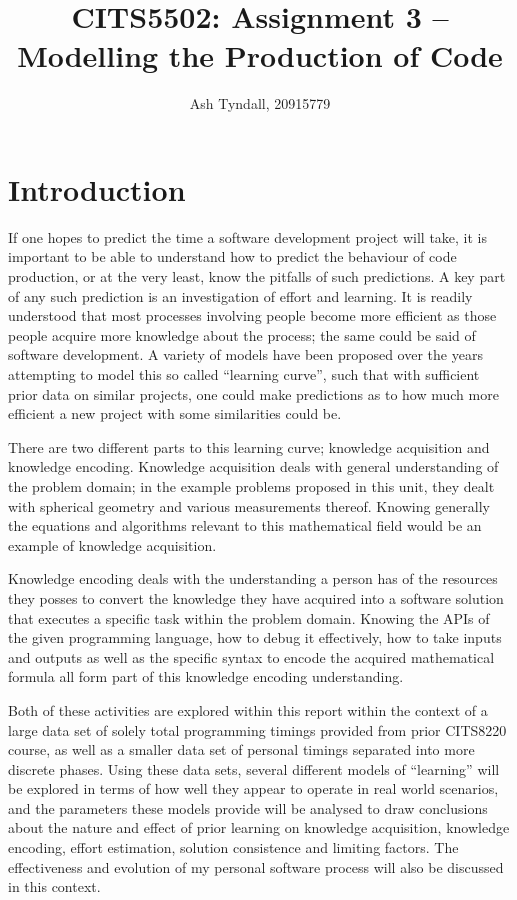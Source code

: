 \documentclass[a4paper,10pt]{article}
\title{CITS5502: Assignment 3 -- Modelling the Production of Code}
\author{Ash Tyndall, 20915779}
\begin{document}
\pagestyle{fancy}
\maketitle
\fontsize{10pt}{11pt}\selectfont
\tableofcontents

\clearpage
\fontsize{11pt}{13pt}\selectfont
\section{Introduction}
If one hopes to predict the time a software development project will take, it is important to be able to understand how to predict the behaviour of code production, or at the very least, know the pitfalls of such predictions. A key part of any such prediction is an investigation of effort and learning. It is readily understood that most processes involving people become more efficient as those people acquire more knowledge about the process; the same could be said of software development. A variety of models have been proposed over the years attempting to model this so called ``learning curve'', such that with sufficient prior data on similar projects, one could make predictions as to how much more efficient a new project with some similarities could be.

There are two different parts to this learning curve; knowledge acquisition and knowledge encoding. Knowledge acquisition deals with general understanding of the problem domain; in the example problems proposed in this unit, they dealt with spherical geometry and various measurements thereof. Knowing generally the equations and algorithms relevant to this mathematical field would be an example of knowledge acquisition.

Knowledge encoding deals with the understanding a person has of the resources they posses to convert the knowledge they have acquired into a software solution that executes a specific task within the problem domain. Knowing the APIs of the given programming language, how to debug it effectively, how to take inputs and outputs as well as the specific syntax to encode the acquired mathematical formula all form part of this knowledge encoding understanding.

Both of these activities are explored within this report within the context of a large data set of solely total programming timings provided from prior CITS8220 course, as well as a smaller data set of personal timings separated into more discrete phases. Using these data sets, several different models of ``learning'' will be explored in terms of how well they appear to operate in real world scenarios, and the parameters these models provide will be analysed to draw conclusions about the nature and effect of prior learning on knowledge acquisition, knowledge encoding, effort estimation, solution consistence and limiting factors. The effectiveness and evolution of my personal software process will also be discussed in this context.
\end{document}
